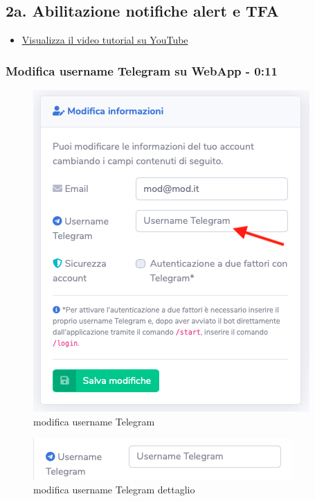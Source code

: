 \newpage \subsection{2a. Abilitazione notifiche alert e TFA}

	\begin{itemize}
		\item \href{https://www.youtube.com/watch?v=PjySMOLCtMA&list=PLPKYjnuIh1FA3b3jn_bwY_ztYzaFn2mIT&index=5}{Visualizza il video tutorial su YouTube} 
	\end{itemize}

	\subsubsection{Modifica username Telegram su WebApp - 0:11}

		\begin{figure}[H]
		\centering
		\includegraphics[scale=0.600]{res/images/membro/modUsername1.png}
		\caption{modifica username Telegram}
	\end{figure}
	\begin{figure}[H]
		\centering
		\includegraphics[scale=0.600]{res/images/membro/modUsTelegram.png}
		\caption{modifica username Telegram dettaglio}
	\end{figure}


